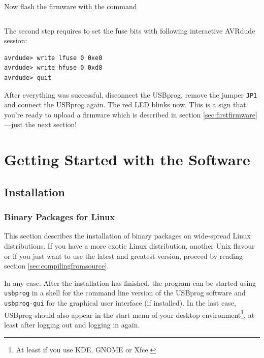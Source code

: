 \documentclass[bibtotoc,UKenglish,halfparskip,oneside,DIV12]{scrreprt}
\begin{document}
Now flash the firmware with the command

\begin{lstlisting}[style=inline]
% avrdude -p m32 -c PROGRAMMER -U flash:w:usbprog_base.hex
\end{lstlisting}

The second step requires to set the fuse bits with following interactive AVRdude session:

\begin{lstlisting}[style=inline]
% avrdude -p m32 -c PROGRAMMER -t
avrdude> write lfuse 0 0xe0
avrdude> write hfuse 0 0xd8
avrdude> quit
\end{lstlisting}

After everything was successful, disconnect the USBprog, remove the jumper \texttt{JP1} and connect
the USBprog again. The red LED blinks now. This is a sign that you're ready to upload a firmware
which is described in section \vref{sec:firstfirmware}---just the next section!


\chapter{Getting Started with the Software}

\section{Installation}
\label{sec:installation}

\subsection{Binary Packages for Linux}
\label{sec:linux_binary_installation}

This section describes the installation of binary packages on wide-spread Linux distributions. If
you have a more exotic Linux distribution, another Unix flavour or if you just want to use the
latest and greatest version, proceed by reading section \vref{sec:compilingfromsource}.

In any case: After the installation has finished, the program can be started using \texttt{usbprog}
in a shell for the command line version of the USBprog software and \texttt{usbprog-gui} for the
graphical user interface (if installed). In the last case, USBprog should also appear in the start
menu of your desktop environment\footnote{At least if you use KDE, GNOME or Xfce.}, at least after
logging out and logging in again.
\end{document}
